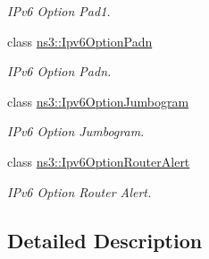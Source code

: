 \begin{DoxyCompactItemize}
\begin{DoxyCompactList}\small\item\em I\+Pv6 Option Pad1. \end{DoxyCompactList}\item 
class \hyperlink{classns3_1_1Ipv6OptionPadn}{ns3\+::\+Ipv6\+Option\+Padn}
\begin{DoxyCompactList}\small\item\em I\+Pv6 Option Padn. \end{DoxyCompactList}\item 
class \hyperlink{classns3_1_1Ipv6OptionJumbogram}{ns3\+::\+Ipv6\+Option\+Jumbogram}
\begin{DoxyCompactList}\small\item\em I\+Pv6 Option Jumbogram. \end{DoxyCompactList}\item 
class \hyperlink{classns3_1_1Ipv6OptionRouterAlert}{ns3\+::\+Ipv6\+Option\+Router\+Alert}
\begin{DoxyCompactList}\small\item\em I\+Pv6 Option Router Alert. \end{DoxyCompactList}\end{DoxyCompactItemize}


\subsection{Detailed Description}
